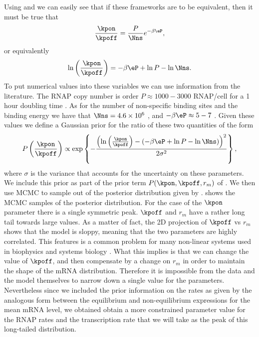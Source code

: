 Using  and  we can easily see that
if these frameworks are to be equivalent, then it must be true that
\begin{equation}
  {\kpon \over \kpoff} = {P \over \Nns} e^{-\beta\eP},
\end{equation}
or equivalently
\begin{equation}
  \ln \left({\kpon \over \kpoff}\right) =
  -\beta\eP + \ln P - \ln \Nns.
\end{equation}
To put numerical values into these variables we can use information from the
literature. The RNAP copy number is order $P \approx 1000-3000$ RNAP/cell for a
1 hour doubling time \cite{Klumpp2008}. As for the number of non-specific
binding sites and the binding energy we have that $\Nns = 4.6\times 10^6$
\cite{Bintu2005a}, and $-\beta\eP \approx 5 - 7$
\cite{Brewster2012}. Given these values we define a Gaussian prior for the ratio
of these two quantities of the form
\begin{equation}
  P\left({\kpon \over \kpoff} \right) \propto
  \exp \left\{ - {\left(\ln \left({\kpon \over \kpoff}\right) -
  \left(-\beta\eP + \ln P - \ln \Nns \right) \right)^2
  \over 2 \sigma^2} \right\},
  \label{seq_prior_single}
\end{equation}
where $\sigma$ is the variance that accounts for the uncertainty on these
parameters. We include this prior as part of the prior term $P(\kpon, \kpoff,
r_m)$ of . We then use MCMC to sample out of the
posterior distribution given by . 
shows the MCMC samples of the posterior distribution. For the case of the
$\kpon$ parameter there is a single symmetric peak. $\kpoff$ and $r_m$ have a
rather long tail towards large values. As a matter of fact, the 2D projection of
$\kpoff$ vs $r_m$ shows that the model is sloppy, meaning that the two
parameters are highly correlated. This features is a common problem for many
non-linear systems used in biophysics and systems biology \cite{Transtrum2015}.
What this implies is that we can change the value of $\kpoff$, and then
compensate by a change on $r_m$ in order to maintain the shape of the mRNA
distribution. Therefore it is impossible from the data and the model themselves
to narrow down a single value for the parameters. Nevertheless since we
included the prior information on the rates as given by the analogous form
between the equilibrium and non-equilibrium expressions for the mean mRNA level,
we obtained obtain a more constrained parameter value for the RNAP rates and the
transcription rate that we will take as the peak of this long-tailed
distribution.

